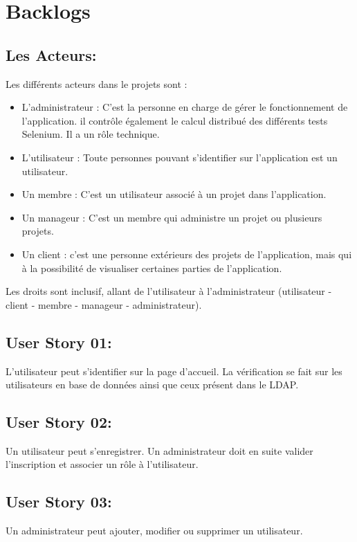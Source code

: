\section{Backlogs}

	\subsection{Les Acteurs:}
		 Les différents acteurs dans le projets sont :
		 \begin{itemize}
		 		\item L'administrateur : C'est la personne en charge de gérer le fonctionnement de l'application. 
		 		il contrôle également le calcul distribué des différents tests Selenium. Il a un rôle technique.
		 		
		 		\item L'utilisateur :  Toute personnes pouvant s'identifier sur l'application est un utilisateur.
		 		
		 		\item Un membre : C'est un utilisateur associé à un projet dans l'application.
		 		
		 		\item Un manageur : C'est un membre qui administre un projet ou plusieurs projets.
		 		
		 		\item Un client : c'est une personne extérieurs des projets de l'application, mais qui à la possibilité de 
		 											visualiser certaines parties de l'application.
		 \end{itemize}

			Les droits sont inclusif, allant de l'utilisateur à l'administrateur (utilisateur - client - membre - manageur - administrateur).


	\subsection{User Story 01:}
	L'utilisateur peut s'identifier sur la page d'accueil. La vérification se fait sur les utilisateurs en base de données ainsi que ceux
	présent dans le LDAP.

	\subsection{User Story 02:}
	Un utilisateur peut s'enregistrer. Un administrateur doit en suite valider l'inscription et associer un rôle à l'utilisateur.
	
	\subsection{User Story 03:}
	Un administrateur peut ajouter, modifier ou supprimer un utilisateur.
	
